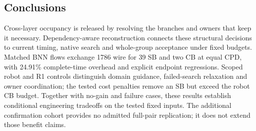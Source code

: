 \documentclass[conference,10pt]{IEEEtran}
\begin{document}
\subsection{Conclusions}
Cross-layer occupancy is released by resolving the branches and owners that keep it necessary. Dependency-aware reconstruction connects these structural decisions to current timing, native search and whole-group acceptance under fixed budgets. Matched BNN flows exchange 1786 wire for 39 SB and two CB at equal CPD, with 24.91\% complete-time overhead and explicit endpoint regressions. Scoped robot and R1 controls distinguish domain guidance, failed-search relaxation and owner coordination; the tested cost penalties remove an SB but exceed the robot CB budget. Together with no-gain and failure cases, these results establish conditional engineering tradeoffs on the tested fixed inputs. The additional confirmation cohort provides no admitted full-pair replication; it does not extend those benefit claims.


\end{document}
